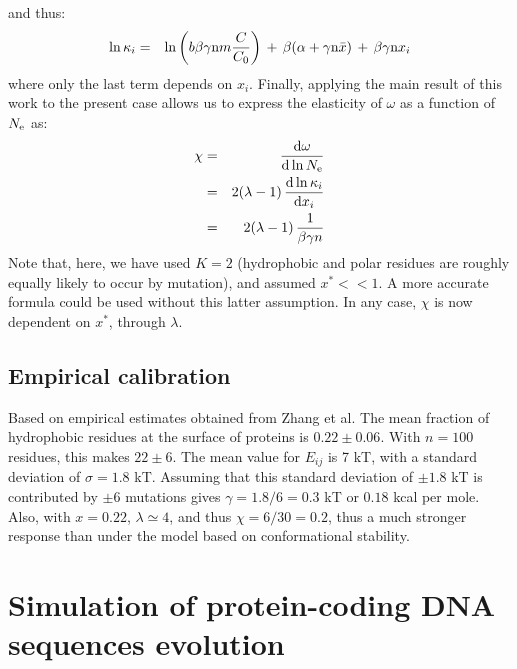 \documentclass{article}
\begin{document}
and thus:
\begin{eqnarray}
\ln \kappa_i &=& \ln \left( b \beta \gamma \text{n} m \frac{C}{C_0}  \right) \, + \, \beta (\alpha +\gamma \text{n} \bar x) \, + \, \beta \gamma\text{n} x_i
\end{eqnarray}
where only the last term depends on $x_i$.
Finally, applying the main result of this work to the present case allows us to express the elasticity of $\omega$ as a function of $N_{\mathrm{e}}$ as:
\begin{eqnarray}
\chi &=& \frac{\mathrm{d}\omega} {\mathrm{d} \ln N_{\mathrm{e}}} 
\\ &=&  2(\lambda - 1) \, \frac{\mathrm{d}\ln \kappa_i}{\mathrm{d} x_i} 
\\ &=&  2 (\lambda - 1) \, \frac{1}{\beta \gamma n}
\end{eqnarray}
Note that, here, we have used $K=2$ (hydrophobic and polar residues are roughly equally likely to occur by mutation), and assumed $x^* << 1$. A more accurate formula could be used without this latter assumption. In any case, $\chi$ is now dependent on $x^*$, through $\lambda$.
\subsection{Empirical calibration}
Based on empirical estimates obtained from Zhang et al. The mean fraction of hydrophobic residues at the surface of proteins is $0.22 \pm 0.06$. With $n=100$ residues, this makes $22 \pm 6$. The mean value for $E_{ij}$ is 7 kT, with a standard deviation of $\sigma = 1.8$ kT. Assuming that this standard deviation of $\pm 1.8$ kT is contributed by $\pm 6$ mutations gives $\gamma = 1.8 / 6 = 0.3$ kT or $0.18$ kcal per mole. Also, with $x=0.22$, $\lambda \simeq 4$, and thus $\chi = 6  / 30 = 0.2$, thus a much stronger response than under the model based on conformational stability.

\section{Simulation of protein-coding DNA sequences evolution}
\end{document}
